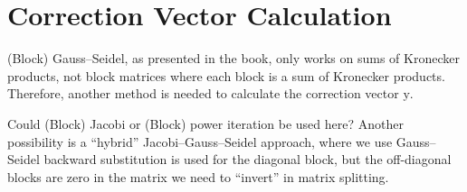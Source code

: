\documentclass[a4paper,10pt,twoside,openright]{memoir}
\renewcommand*{\vec}[1]{\boldsymbol{\mathrm{#1}}}
\begin{document}
\section{Correction Vector Calculation}

(Block) Gauss--Seidel, as presented in the book, only works on sums of
Kronecker products, not block matrices where each block is a sum of
Kronecker products. Therefore, another method is needed to calculate
the correction vector $\vec{y}$.

Could (Block) Jacobi or (Block) power iteration \citep[Section
3.2]{dayar2012analyzing} be used here? Another possibility is a
``hybrid'' Jacobi--Gauss--Seidel approach, where we use Gauss--Seidel
backward substitution is used for the diagonal block, but the
off-diagonal blocks are zero in the matrix we need to ``invert'' in
matrix splitting.

\backmatter

\printbibliography
\end{document}
